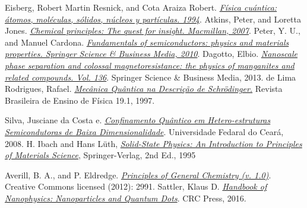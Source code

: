   Eisberg, Robert Martin Resnick, and Cota Araiza Robert. \href{http://gen.lib.rus.ec/book/index.php?md5=80CCC290E6FFF645ADF0BA24178E4C5D}\textit{Física cuántica: átomos, moléculas, sólidos, núcleos y partículas. 1994}.
  Atkins, Peter, and Loretta Jones. \href{http://gen.lib.rus.ec/book/index.php?md5=6D32E94CECA0A9BD6FFF5F1307078071}\textit{Chemical principles: The quest for insight. Macmillan, 2007}.
  Peter, Y. U., and Manuel Cardona. \href{http://gen.lib.rus.ec/book/index.php?md5=20A8507AB491C812ED2C75D08740987A}\textit{Fundamentals of semiconductors: physics and materials properties. Springer Science \& Business Media, 2010}.
  Dagotto, Elbio. \href{http://gen.lib.rus.ec/book/index.php?md5=3C621FEBFE1EBBF8B376CED188D04A84}\textit{Nanoscale phase separation and colossal magnetoresistance: the physics of manganites and related compounds. Vol. 136}. Springer Science \& Business Media, 2013.
  de Lima Rodrigues, Rafael. \href{http://sbfisica.org.br/rbef/pdf/v19_68.pdf}\textit{Mecânica Quântica na Descrição de Schrödinger.} Revista Brasileira de Ensino de Física 19.1, 1997.

  Silva, Jusciane da Costa e. \href{www.repositorio.ufc.br/bitstream/riufc/12669/1/2008_tese_jcsilva.pdf}\textit{Confinamento Quântico em Hetero-estruturas Semicondutoras de Baixa Dimensionalidade}. Universidade Fedaral do Ceará, 2008.
  H. Ibach and Hans Lüth, \href{http://www.springer.com/us/book/9783540938033}\textit{Solid-State Physics: An Introduction to Principles of Materials Science}, Springer-Verlag, 2nd Ed., 1995


 Averill, B. A., and P. Eldredge. \href{https://2012books.lardbucket.org/books/principles-of-general-chemistry-v1.0m/index.html}\textit{Principles of General Chemistry (v. 1.0)}. Creative Commons licensed (2012): 2991.
 Sattler, Klaus D. \href{https://www.amazon.com/Handbook-Nanophysics-Nanoparticles-Quantum-Dots-ebook/dp/B008I9VLAI}\textit{Handbook of Nanophysics: Nanoparticles and Quantum Dots}. CRC Press, 2016.
